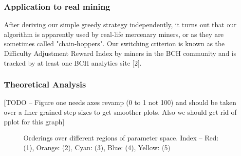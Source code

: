 \documentclass[10pt, preprint]{aastex}
\begin{document}
\subsubsection{Application to real mining}
After deriving our simple greedy strategy independently, it turns out that our algorithm is apparently used by real-life mercenary miners, or as they are sometimes called "chain-hoppers".  Our switching criterion is known as the Difficulty Adjustment Reward Index by miners in the BCH community and is tracked by at least one BCH analytics site [2].

\subsubsection{Theoretical Analysis}
[TODO -- Figure one needs axes revamp (0 to 1 not 100) and should be taken over a finer grained step sizes to get smoother plots.  Also we should get rid of pplot for this graph]
\begin{figure}
	\centering
	\qquad
	\qquad
	\qquad
	\caption{Orderings over different regions of parameter space. Index -- Red: (1), Orange: (2), Cyan: (3), Blue: (4), Yellow: (5)}
\end{figure}
\end{document}
